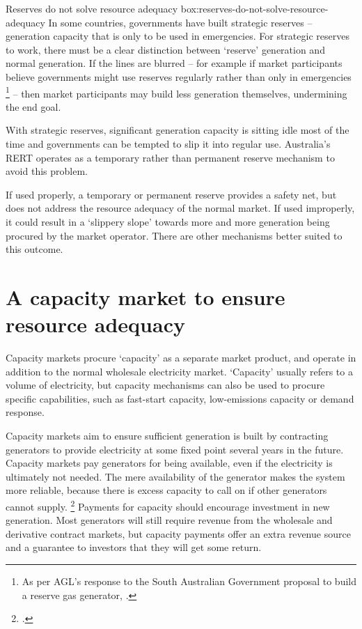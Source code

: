 \documentclass[FrontPage]{grattan}
\begin{document}
\begin{smallbox}{Reserves do not solve resource adequacy }{box:reserves-do-not-solve-resource-adequacy}
In some countries, governments have built strategic reserves -- generation capacity that is only to be used in emergencies. For strategic reserves to work, there must be a clear distinction between `reserve' generation and normal generation. If the lines are blurred -- for example if market participants believe governments might use reserves regularly rather than only in emergencies%
\footnote{As per AGL's response to the South Australian Government proposal to build a reserve gas generator, \textcite{MacdonaldSmith2017AGLshredsPlans}.}
-- then market participants may build less generation themselves, undermining the end goal.

With strategic reserves, significant generation capacity is sitting idle most of the time and governments can be tempted to slip it into regular use. Australia's RERT operates as a temporary rather than permanent reserve mechanism to avoid this problem.

If used properly, a temporary or permanent reserve provides a safety net, but does not address the resource adequacy of the normal market. If used improperly, it could result in a `slippery slope' towards more and more generation being procured by the market operator. There are other mechanisms better suited to this outcome.
\end{smallbox}


\section{A capacity market to ensure resource adequacy}\label{sec:a-capacity-market-to-ensure-resource-adequacy}
Capacity markets procure `capacity' as a separate market product, and operate in addition to the normal wholesale electricity market. `Capacity' usually refers to a volume of electricity, but capacity mechanisms can also be used to procure specific capabilities, such as fast-start capacity, low-emissions capacity or demand response.

Capacity markets aim to ensure sufficient generation is built by contracting generators to provide electricity at some fixed point several years in the future. Capacity markets pay generators for being available, even if the electricity is ultimately not needed. The mere availability of the generator makes the system more reliable, because there is excess capacity to call on if other generators cannot supply.%
\footcite{Cramton2005CapacityMarket}
Payments for capacity should encourage investment in new generation. Most generators will still require revenue from the wholesale and derivative contract markets, but capacity payments offer an extra revenue source and a guarantee to investors that they will get some return.
\end{document}
